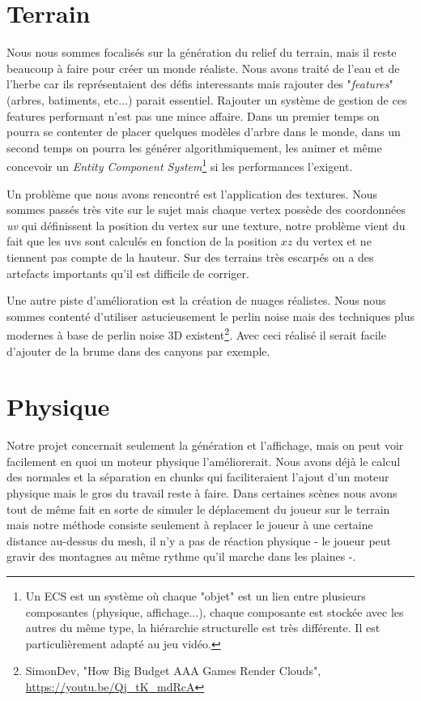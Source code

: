 \documentclass{EPUProjetDi}
\begin{document}
\section{Terrain}

Nous nous sommes focalisés sur la génération du relief du terrain, mais il reste beaucoup à faire pour créer un monde réaliste. Nous avons traité de l'eau et de l'herbe car ils représentaient des défis interessants mais rajouter des "\textit{features}" (arbres, batiments, etc...) parait essentiel. Rajouter un système de gestion de ces features performant n'est pas une mince affaire. Dans un premier temps on pourra se contenter de placer quelques modèles d'arbre dans le monde, dans un second temps on pourra les générer algorithmiquement, les animer et même concevoir un \textit{Entity Component System}\footnote{Un ECS est un système où chaque "objet" est un lien entre plusieurs composantes (physique, affichage...), chaque composante est stockée avec les autres du même type, la hiérarchie structurelle est très différente. Il est particulièrement adapté au jeu vidéo.} si les performances l'exigent.

\par
Un problème que nous avons rencontré est l'application des textures. Nous sommes passés très vite sur le sujet mais chaque vertex possède des coordonnées \textit{uv} qui définissent la position du vertex sur une texture, notre problème vient du fait que les uvs sont calculés en fonction de la position $xz$ du vertex et ne tiennent pas compte de la hauteur. Sur des terrains très escarpés on a des artefacts importants qu'il est difficile de corriger.

\par
Une autre piste d'amélioration est la création de nuages réalistes. Nous nous sommes contenté d'utiliser astucieusement le perlin noise mais des techniques plus modernes à base de perlin noise 3D existent\footnote{SimonDev, "How Big Budget AAA Games Render Clouds", \url{https://youtu.be/Qj_tK_mdRcA}}. Avec ceci réalisé il serait facile d'ajouter de la brume dans des canyons par exemple.

\section{Physique}

Notre projet concernait seulement la génération et l'affichage, mais on peut voir facilement en quoi un moteur physique l'améliorerait. Nous avons déjà le calcul des normales et la séparation en chunks qui faciliteraient l'ajout d'un moteur physique mais le gros du travail reste à faire. Dans certaines scènes nous avons tout de même fait en sorte de simuler le déplacement du joueur sur le terrain mais notre méthode consiste seulement à replacer le joueur à une certaine distance au-dessus du mesh, il n'y a pas de réaction physique - le joueur peut gravir des montagnes au même rythme qu'il marche dans les plaines -.
\end{document}
